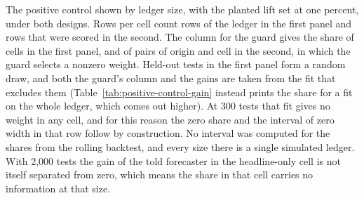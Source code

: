 \label{sec:control-detail}
\begin{table}[t]\centering\scriptsize
\caption{The positive control shown by ledger size, with the planted lift set at one percent, under both designs. Rows per cell count rows of the ledger in the first panel and rows that were scored in the second. The column for the guard gives the share of cells in the first panel, and of pairs of origin and cell in the second, in which the guard selects a nonzero weight. Held-out tests in the first panel form a random draw, and both the guard's column and the gains are taken from the fit that excludes them (Table~\ref{tab:positive-control-gain} instead prints the share for a fit on the whole ledger, which comes out higher). At 300 tests that fit gives no weight in any cell, and for this reason the zero share and the interval of zero width in that row follow by construction. No interval was computed for the shares from the rolling backtest, and every size there is a single simulated ledger. With 2,000 tests the gain of the told forecaster in the headline-only cell is not itself separated from zero, which means the share in that cell carries no information at that size.}
\label{tab:fmt-control}
\resizebox{\columnwidth}{!}{}
\end{table}

